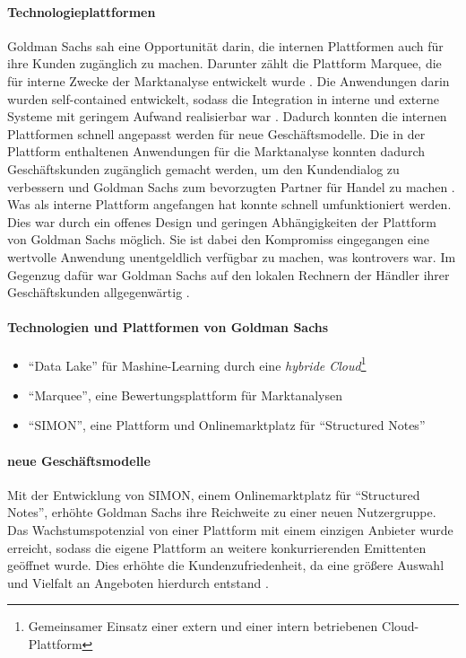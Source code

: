 \paragraph{Technologieplattformen}
Goldman Sachs sah eine Opportunität darin, die internen Plattformen auch für ihre Kunden zugänglich zu machen. Darunter zählt die Plattform Marquee, die für interne Zwecke der Marktanalyse entwickelt wurde \cite{Gupta:2017}.
Die Anwendungen darin wurden self-contained entwickelt, sodass die Integration in interne und externe Systeme mit geringem Aufwand realisierbar war \cite{Gupta:2017}. Dadurch konnten die internen Plattformen schnell angepasst werden für neue Geschäftsmodelle. Die in der Plattform enthaltenen Anwendungen für die Marktanalyse konnten dadurch Geschäftskunden zugänglich gemacht werden, um den Kundendialog zu verbessern und Goldman Sachs zum bevorzugten Partner für Handel zu machen \cite{Gupta:2017}.
\medskip
\\
Was als interne Plattform angefangen hat konnte schnell umfunktioniert werden. Dies war durch ein offenes Design und geringen Abhängigkeiten der Plattform von Goldman Sachs möglich. Sie ist dabei den Kompromiss eingegangen eine wertvolle Anwendung unentgeldlich verfügbar zu machen, was kontrovers war. Im Gegenzug dafür war Goldman Sachs auf den lokalen Rechnern der Händler ihrer Geschäftskunden allgegenwärtig \cite{Gupta:2017}.

%
\paragraph{Technologien und Plattformen von Goldman Sachs}
\label{goldman:plattform}
\begin{itemize}
    \item \enquote{Data Lake} für Mashine-Learning durch eine \emph{hybride Cloud}\footnote{Gemeinsamer Einsatz einer extern und einer intern betriebenen Cloud-Plattform}
    \item \enquote{Marquee}, eine Bewertungsplattform für Marktanalysen
    \item \enquote{SIMON}, eine Plattform und Onlinemarktplatz für \enquote{Structured Notes}
\end{itemize}

\paragraph{neue Geschäftsmodelle}
Mit der Entwicklung von SIMON, einem Onlinemarktplatz für \enquote{Structured Notes}, erhöhte Goldman Sachs ihre Reichweite zu einer neuen Nutzergruppe. Das Wachstumspotenzial von einer Plattform mit einem einzigen Anbieter wurde erreicht, sodass die eigene Plattform an weitere konkurrierenden Emittenten geöffnet wurde. Dies erhöhte die Kundenzufriedenheit, da eine größere Auswahl und Vielfalt an Angeboten hierdurch entstand \cite{Gupta:2017}.

